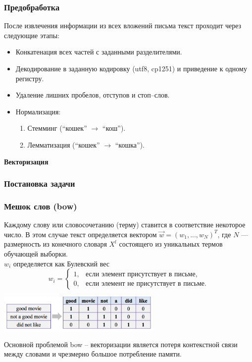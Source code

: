 \documentclass[compress,professionalfont]{beamer}
\begin{document}
\begin{frame}
\frametitle{Предобработка}

После извлечения информации из всех вложений письма текст проходит через следующие этапы:
\begin{itemize}
\item Конкатенация всех частей с заданными разделителями.
\item Декодирование в заданную кодировку (utf8, cp1251) и приведение к одному регистру.
\item Удаление лишних пробелов, отступов и стоп--слов.
\item Нормализация:
\begin{enumerate}
\item Стемминг (``кошек'' $\rightarrow$ ``кош'').
\item Лемматизация (``кошек'' $\rightarrow$ ``кошка'').
\end{enumerate}
\end{itemize}

\end{frame}

\begin{frame}

\begin{center}
\Huge\bf Векторизация
\end{center}

\end{frame}

\begin{frame}
\frametitle{Постановка задачи}

\end{frame}

\begin{frame}
\frametitle{Мешок слов (bow)}

Каждому слову или словосочетанию (терму) ставится в соответствие некоторое число. В этом случае текст определяется вектором $\vec{w} = (w_1, ..., w_N)^T$,
где $N$ --- размерность из конечного словаря $X^l$ состоящего из уникальных термов обучающей выборки. \\
$w_i$ определяется как Булевский вес
$$
w_i = \begin{cases}
1, & \mbox{если элемент присутствует в письме}, \\
0, & \mbox{если элемент не присутствует в письме}.
\end{cases}
$$

\begin{center}
\includegraphics[width=0.6\textwidth]{bow.png}
\end{center}

Основной проблемой bow -- векторизации является потеря контекстной связи между словами и чрезмерно большое потребление памяти.

\end{frame}
\end{document}
